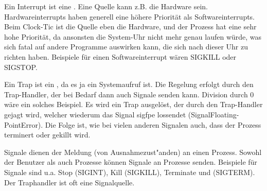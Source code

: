 \begin{answer}
  Ein Interrupt ist eine . Eine Quelle kann z.B. die Hardware sein. Hardwareinterrupts haben generell eine höhere Priorität als Softwareinterrupts.
  Beim Clock-Tic ist die Quelle eben die Hardware, und der Prozess hat eine sehr hohe
  Priorität, da ansonsten die System-Uhr nicht mehr genau laufen würde, was sich fatal auf
  andere Programme auswirken kann, die sich nach dieser Uhr zu richten haben.
  Beispiele für einen Softwareinterrupt wären SIGKILL oder SIGSTOP.
\end{answer}

\begin{answer}
  Ein Trap ist ein , da es ja ein Systemaufruf ist.
  Die Regelung erfolgt durch den Trap-Handler, der bei Bedarf dann auch Signale senden
  kann. Division durch 0 wäre ein solches Beispiel. Es wird ein Trap ausgelöst, der durch den
  Trap-Handler gejagt wird, welcher wiederum das Signal sigfpe lossendet (SignalFloating-
  PointError). Die Folge ist, wie bei vielen anderen Signalen auch, dass der Prozess terminert
  oder gekillt wird.
\end{answer}

\begin{answer}
  Signale dienen der Meldung (von Ausnahmezust"anden) an einen Prozess. Sowohl der Benutzer als auch Prozesse können Signale an Prozesse senden. Beispiele für Signale sind u.a. Stop (SIGINT), Kill (SIGKILL), Terminate und (SIGTERM). Der Traphandler ist oft eine Signalquelle.
\end{answer}

